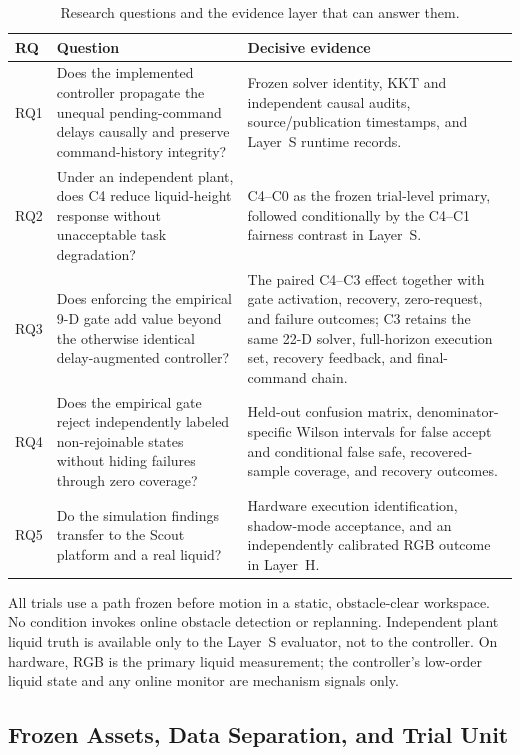 \begin{table}[t]
  \centering
  \caption{Research questions and the evidence layer that can answer them.}
  \label{tab:research_questions}
  \small
  \begin{tabular}{@{}p{}p{}p{}@{}}
    \toprule
    RQ & Question & Decisive evidence \\
    \midrule
    RQ1 & Does the implemented controller propagate the unequal pending-command delays causally and preserve command-history integrity? & Frozen solver identity, KKT and independent causal audits, source/publication timestamps, and Layer~S runtime records. \\
    RQ2 & Under an independent plant, does C4 reduce liquid-height response without unacceptable task degradation? & C4--C0 as the frozen trial-level primary, followed conditionally by the C4--C1 fairness contrast in Layer~S. \\
    RQ3 & Does enforcing the empirical 9-D gate add value beyond the otherwise identical delay-augmented controller? & The paired C4--C3 effect together with gate activation, recovery, zero-request, and failure outcomes; C3 retains the same 22-D solver, full-horizon execution set, recovery feedback, and final-command chain. \\
    RQ4 & Does the empirical gate reject independently labeled non-rejoinable states without hiding failures through zero coverage? & Held-out confusion matrix, denominator-specific Wilson intervals for false accept and conditional false safe, recovered-sample coverage, and recovery outcomes. \\
    RQ5 & Do the simulation findings transfer to the Scout platform and a real liquid? & Hardware execution identification, shadow-mode acceptance, and an independently calibrated RGB outcome in Layer~H. \\
    \bottomrule
  \end{tabular}
\end{table}

All trials use a path frozen before motion in a static, obstacle-clear
workspace.  No condition invokes online obstacle detection or replanning.
Independent plant liquid truth is available only to the Layer~S evaluator,
not to the controller.  On hardware, RGB is the primary liquid measurement;
the controller's low-order liquid state and any online monitor are mechanism
signals only.

\subsection{Frozen Assets, Data Separation, and Trial Unit}


